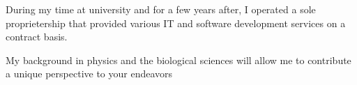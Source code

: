 \begin{cvletter}

	During my time at university and for a few years after, I operated a
	sole proprietership that provided various IT and software development
	services on a contract basis.

	My background in physics and the biological sciences will allow me to
	contribute a unique perspective to your endeavors

\end{cvletter}
